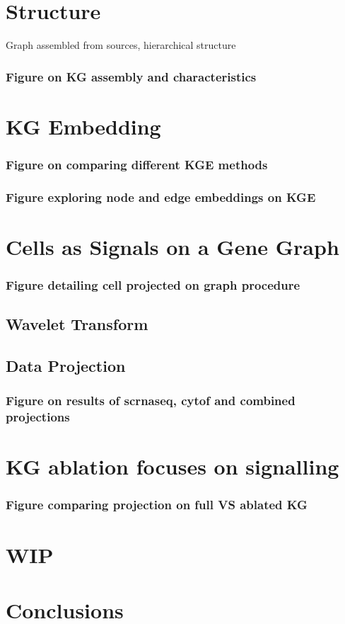 \section{Structure}

Graph assembled from sources, hierarchical structure

\subsubsection{Figure on KG assembly and characteristics}

\section{KG Embedding}

\subsubsection{Figure on comparing different KGE methods}

\subsubsection{Figure exploring node and edge embeddings on KGE}

\section{Cells as Signals on a Gene Graph}

\subsubsection{Figure detailing cell projected on graph procedure}

\subsection{Wavelet Transform}

\subsection{Data Projection}

\subsubsection{Figure on results of scrnaseq, cytof and combined projections}

\section{KG ablation focuses on signalling}

\subsubsection{Figure comparing projection on full VS ablated KG}

\section{WIP}

\section{Conclusions}
